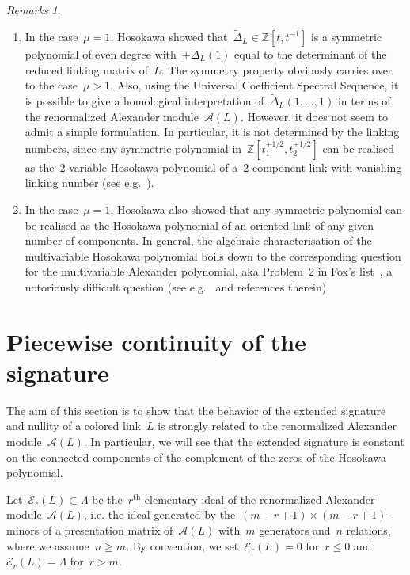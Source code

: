 \documentclass{amsart}
\newcommand{\Z}{\mathbb{Z}}
\newcommand{\A}{\mathcal{A}}
\theoremstyle{definition}
\theoremstyle{remark}
\newtheorem{rems}[thm]{Remarks}
\begin{document}
\begin{rems}
\begin{enumerate}
	\item In the case~$\mu=1$, Hosokawa showed that~$\widetilde{\Delta}_L\in\Z[t,t^{-1}]$ is a symmetric polynomial of even degree with~$\pm\widetilde{\Delta}_L(1)$ equal to the determinant of the reduced linking matrix of~$L$.
	The symmetry property obviously carries over to the case~$\mu>1$. Also, using the Universal Coefficient Spectral Sequence, it is possible to give a homological interpretation of~$\widetilde{\Delta}_L(1,\dots,1)$ in terms of the
	renormalized Alexander module~$\A(L)$. However, it does not seem to admit a simple formulation.
	In particular, it is not determined by the linking numbers, since any symmetric polynomial in~$\Z[t_1^{\pm 1/2},t_2^{\pm 1/2}]$ can be realised as the~2-variable Hosokawa polynomial of a~2-component link with vanishing linking number (see e.g.~\cite{Pla86}). 
	
	\item In the case~$\mu=1$, Hosokawa also showed that any symmetric polynomial can be realised as the Hosokawa polynomial of an oriented link of any given number of components.
	In general, the algebraic characterisation of the multivariable Hosokawa polynomial
	boils down to the corresponding question for the multivariable Alexander polynomial, aka Problem~2 in
	Fox's list~\cite{Fox61}, a notoriously difficult question (see e.g.~\cite{Pla86} and references therein).
	\end{enumerate}
	\end{rems}
	
	
	\section{Piecewise continuity of the signature}
	\label{sec:cont}
	
The aim of this section is to show that the behavior of the extended signature and nullity of a colored link~$L$ is strongly related to the renormalized Alexander module~$\A(L)$. In particular, we will see that the extended signature
is constant on the connected components of the complement of the zeros of the Hosokawa polynomial.

\medskip
	
	Let~$\mathcal{E}_r(L)\subset\Lambda$ be the~$r^\text{th}$-elementary ideal of the renormalized Alexander
	module~$\A(L)$, i.e. the ideal generated by the~$(m-r+1)\times(m-r+1)$-minors of a presentation matrix of~$\A(L)$ with~$m$
	generators and~$n$ relations, where we assume~$n\ge m$. By convention, we set~$\mathcal{E}_r(L)=0$ for~$r\le 0$ and~$\mathcal{E}_r(L)=\Lambda$ for~$r> m$. 
\end{document}
